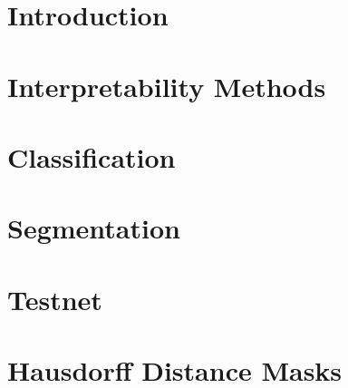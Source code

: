 \chapter{Introduction}


\chapter{Interpretability Methods}








\chapter{Classification}







\chapter{Segmentation}










\chapter{Testnet}


\chapter{Hausdorff Distance Masks}






%
%




%

